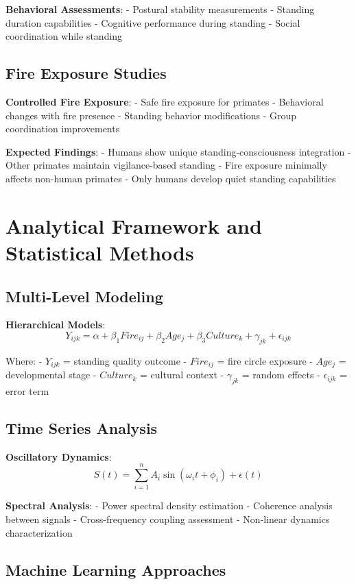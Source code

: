 \documentclass[12pt]{article}
\begin{document}
\textbf{Behavioral Assessments}:
- Postural stability measurements
- Standing duration capabilities
- Cognitive performance during standing
- Social coordination while standing

\subsection{Fire Exposure Studies}

\textbf{Controlled Fire Exposure}:
- Safe fire exposure for primates
- Behavioral changes with fire presence
- Standing behavior modifications
- Group coordination improvements

\textbf{Expected Findings}:
- Humans show unique standing-consciousness integration
- Other primates maintain vigilance-based standing
- Fire exposure minimally affects non-human primates
- Only humans develop quiet standing capabilities

\section{Analytical Framework and Statistical Methods}

\subsection{Multi-Level Modeling}

\textbf{Hierarchical Models}:
$$Y_{ijk} = \alpha + \beta_1 Fire_{ij} + \beta_2 Age_j + \beta_3 Culture_k + \gamma_{jk} + \epsilon_{ijk}$$

Where:
- $Y_{ijk}$ = standing quality outcome
- $Fire_{ij}$ = fire circle exposure
- $Age_j$ = developmental stage
- $Culture_k$ = cultural context
- $\gamma_{jk}$ = random effects
- $\epsilon_{ijk}$ = error term

\subsection{Time Series Analysis}

\textbf{Oscillatory Dynamics}:
$$S(t) = \sum_{i=1}^{n} A_i \sin(\omega_i t + \phi_i) + \epsilon(t)$$

\textbf{Spectral Analysis}:
- Power spectral density estimation
- Coherence analysis between signals
- Cross-frequency coupling assessment
- Non-linear dynamics characterization

\subsection{Machine Learning Approaches}
\end{document}
